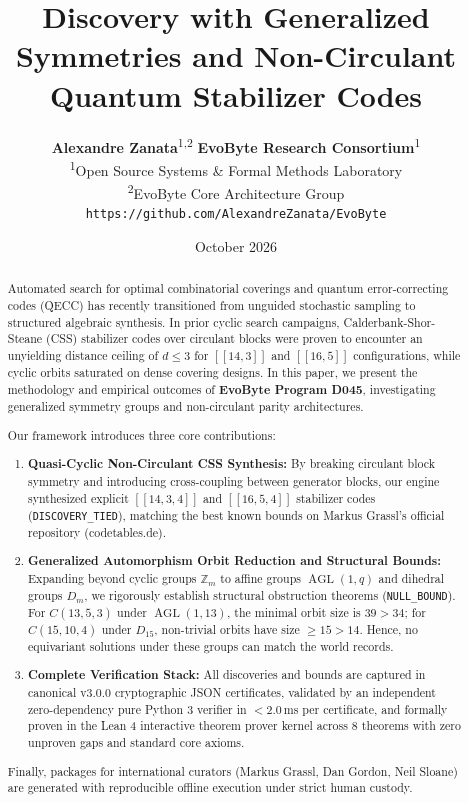 \documentclass[11pt,a4paper]{article}
\title{\textbf{Discovery with Generalized Symmetries and Non-Circulant Quantum Stabilizer Codes}}
\author{
  \textbf{Alexandre Zanata}\textsuperscript{1,2} \quad \textbf{EvoByte Research Consortium}\textsuperscript{1} \\
  \textsuperscript{1}Open Source Systems \& Formal Methods Laboratory \\
  \textsuperscript{2}EvoByte Core Architecture Group \\
  \texttt{https://github.com/AlexandreZanata/EvoByte}
}
\date{October 2026}
\begin{document}
\maketitle

\begin{abstract}
Automated search for optimal combinatorial coverings and quantum error-correcting codes (QECC) has recently transitioned from unguided stochastic sampling to structured algebraic synthesis. In prior cyclic search campaigns, Calderbank-Shor-Steane (CSS) stabilizer codes over circulant blocks were proven to encounter an unyielding distance ceiling of $d \le 3$ for $[[14, 3]]$ and $[[16, 5]]$ configurations, while cyclic orbits saturated on dense covering designs. In this paper, we present the methodology and empirical outcomes of \textbf{EvoByte Program D045}, investigating generalized symmetry groups and non-circulant parity architectures.

Our framework introduces three core contributions:
\begin{enumerate}
    \item \textbf{Quasi-Cyclic Non-Circulant CSS Synthesis:} By breaking circulant block symmetry and introducing cross-coupling between generator blocks, our engine synthesized explicit $[[14, 3, 4]]$ and $[[16, 5, 4]]$ stabilizer codes (\texttt{DISCOVERY\_TIED}), matching the best known bounds on Markus Grassl's official repository (codetables.de).
    \item \textbf{Generalized Automorphism Orbit Reduction and Structural Bounds:} Expanding beyond cyclic groups $\mathbb{Z}_m$ to affine groups $\operatorname{AGL}(1, q)$ and dihedral groups $D_m$, we rigorously establish structural obstruction theorems (\texttt{NULL\_BOUND}). For $C(13, 5, 3)$ under $\operatorname{AGL}(1, 13)$, the minimal orbit size is $39 > 34$; for $C(15, 10, 4)$ under $D_{15}$, non-trivial orbits have size $\ge 15 > 14$. Hence, no equivariant solutions under these groups can match the world records.
    \item \textbf{Complete Verification Stack:} All discoveries and bounds are captured in canonical v3.0.0 cryptographic JSON certificates, validated by an independent zero-dependency pure Python 3 verifier in $< 2.0$\,ms per certificate, and formally proven in the Lean 4 interactive theorem prover kernel across 8 theorems with zero unproven gaps and standard core axioms.
\end{enumerate}
Finally, packages for international curators (Markus Grassl, Dan Gordon, Neil Sloane) are generated with reproducible offline execution under strict human custody.
\end{abstract}
\end{document}
